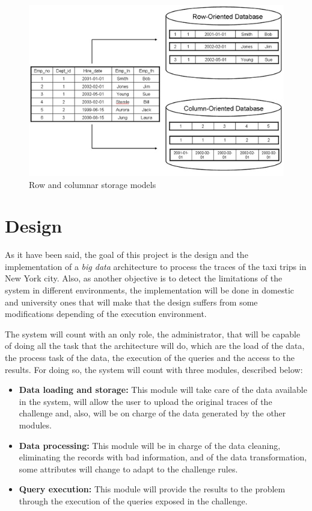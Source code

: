 \begin{figure}[htp!]
	\centering
	\caption{Row and columnar storage models \cite{column}}
	\label{columnEng}
	\vspace{5pt}
	\includegraphics[scale=0.7]{graphics/column}
\end{figure}

\section{Design}
As it have been said, the goal of this project is the design and the implementation of a \textit{big data} architecture to process the traces of the taxi trips in New York city. Also, as another objective is to detect the limitations of the system in different environments, the implementation will be done in domestic and university ones that will make that the design suffers from some modifications depending of the execution environment.

The system will count with an only role, the administrator, that will be capable of doing all the task that the architecture will do, which are the load of the data, the process task of the data, the execution of the queries and the access to the results. For doing so, the system will count with three modules, described below:

\begin{itemize}
\item \textbf{Data loading and storage:} This module will take care of the data available in the system, will allow the user to upload the original traces of the challenge and, also, will be on charge of the data generated by the other modules.
\item \textbf{Data processing:} This module will be in charge of the data cleaning, eliminating the records with bad information, and of the data transformation, some attributes will change to adapt to the challenge rules.
\item \textbf{Query execution:} This module will provide the results to the problem through the execution of the queries exposed in the challenge.
\end{itemize}

